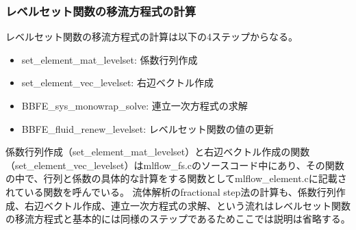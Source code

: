 \subsubsection{レベルセット関数の移流方程式の計算}
レベルセット関数の移流方程式の計算は以下の4ステップからなる。
\begin{itemize}
	\item set\_element\_mat\_levelset: 係数行列作成
	\item set\_element\_vec\_levelset: 右辺ベクトル作成
	\item BBFE\_sys\_monowrap\_solve: 連立一次方程式の求解
	\item BBFE\_fluid\_renew\_levelset: レベルセット関数の値の更新
\end{itemize}
係数行列作成（set\_element\_mat\_levelset）と右辺ベクトル作成の関数（set\_element\_vec\_levelset）はmlflow\_fs.cのソースコード中にあり、その関数の中で、行列と係数の具体的な計算をする関数としてmlflow\_element.cに記載されている関数を呼んでいる。
流体解析のfractional step法の計算も、係数行列作成、右辺ベクトル作成、連立一次方程式の求解、という流れはレベルセット関数の移流方程式と基本的には同様のステップであるためここでは説明は省略する。

